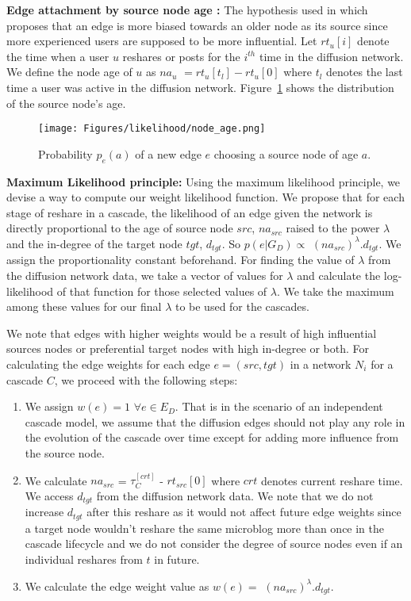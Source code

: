 \documentclass[smallextended]{svjour3}       %
\theoremstyle{definition}
\begin{document}
\textbf{Edge attachment by source node age :} The hypothesis used in \cite{evol_lesk} which proposes that an edge is more biased towards an older node as its source since more experienced users are supposed to be more influential. Let $rt_u[i] $ denote the time when a user $u$ reshares or posts for the $i^{th}$ time in the diffusion network. We define the node age of $u$ as $na_u$ $=rt_u[t_l] - rt_u[0]$ where $t_l$ denotes the last time a user was active in the diffusion network. Figure~\ref{fig:node_age} shows the distribution of the source node's age. 

\begin{figure}[!h]
	\centering
	\texttt{[image: Figures/likelihood/node\_age.png]}
	\caption{Probability $p_e(a)$ of a new edge $e$ choosing a source node of age $a$.}
	\label{fig:node_age}
\end{figure}


\textbf{Maximum Likelihood principle:} Using the maximum likelihood principle, we devise a way to compute our weight likelihood function. We propose that for each stage of reshare in a cascade, the likelihood of an edge given the network is directly proportional to the age of source node $src$,  $na_{src}$ raised to the power $\lambda $ and the in-degree of the target node $tgt$, $d_{tgt}$. So $p(e| G_D) \propto$ $(na_{src})^\lambda .d_{tgt} $. We assign the proportionality constant beforehand. For finding the value of $\lambda $ from the diffusion network data, we take a vector of values for $\lambda $ and calculate the log-likelihood of that function for those selected values of $\lambda$. We take the maximum among these values for our final $\lambda $ to be used for the cascades.

We note that edges with higher weights would be a result of high influential sources nodes or preferential target nodes with high in-degree or both. For calculating the edge weights for each edge $e = (src, tgt) $ in a network $N_i $ for a cascade $C $, we proceed with the following steps:

\begin{enumerate}
	\item We assign $w(e) = 1$ $\forall e \in  E_D$. That is in the scenario of an independent cascade model, we assume that the diffusion edges should not play any role in the evolution of the cascade over time except for adding more influence from the source node.  
	\item We calculate $na_{src}$ = $\tau_C^{[crt]} $ - $rt_{src}[0]$ where $crt$ denotes current reshare time. We access $d_{tgt}$ from the diffusion network data. We note that we do not increase $d_{tgt}$ after this reshare as it would not affect future edge weights since a target node wouldn't reshare the same microblog more than once in the cascade lifecycle and we do not consider the degree of source nodes even if an individual reshares from $t$ in future.
	\item We calculate the edge weight value as $w(e) = $ $(na_{src})^\lambda .d_{tgt} $.

\end{enumerate}  
\end{document}
